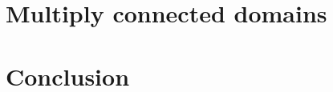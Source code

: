 \documentclass{article}
\begin{document}
\section{Multiply connected domains \label{sec:multiply}}



\section{Conclusion \label{sec:conclusion}}






\end{document}
